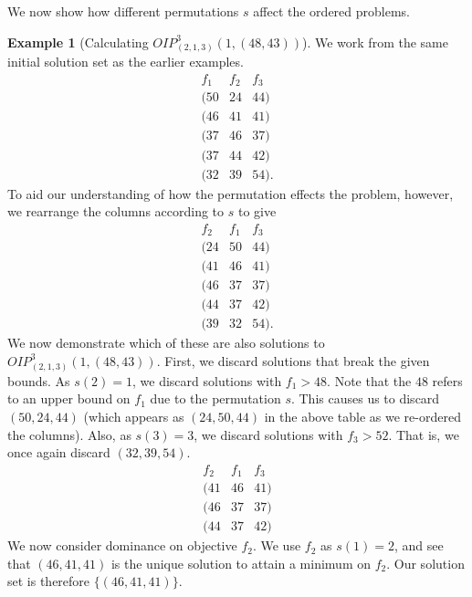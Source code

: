 \documentclass{amsart}
\theoremstyle{definition}
\newtheorem{example}{Example}
\begin{document}
We now show how different permutations $s$ affect the ordered problems.
\begin{example}[Calculating ${O\!I\!P}^3_{(2,1,3)}(1, (48,43))$]\label{ex:lips}
  We work from the same initial solution set as the earlier examples.
\[
\begin{array}{ccc}
  f_1 & f_2 & f_3 \\ \hline
  (50 & 24 & 44) \\
  (46 & 41 & 41) \\
  (37 & 46 & 37) \\
  (37 & 44 & 42) \\
  (32 & 39 & 54).
\end{array}
\]
To aid our understanding of how the permutation effects the problem, however, we rearrange the columns according to $s$ to give
\[
\begin{array}{ccc}
  f_2 & f_1 & f_3 \\ \hline
  (24 & 50 & 44) \\
  (41 & 46 & 41) \\
  (46 & 37 & 37) \\
  (44 & 37 & 42) \\
  (39 & 32 & 54).
\end{array}
\]
  We now demonstrate which of these are also solutions to ${O\!I\!P}^3_{(2,1,3)}(1, (48, 43))$.
  First, we discard solutions that break the given bounds.
  As $s(2) = 1$, we discard solutions with $f_1 > 48$.
  Note that the $48$ refers to an upper bound on $f_1$ due to the permutation $s$.
  This causes us to discard $(50, 24, 44)$ (which appears as $(24, 50, 44)$ in the above table as we re-ordered the columns).
  Also, as $s(3) = 3$, we discard solutions with $f_3 > 52$.
  That is, we once again discard $(32,39,54)$.
\[
\begin{array}{c|cc}
  f_2 & f_1 & f_3 \\ \hline
  (41 & 46 & 41) \\
  (46 & 37 & 37) \\
  (44 & 37 & 42) 
\end{array}
\]
  We now consider dominance on objective $f_2$.
  We use $f_2$ as $s(1) = 2$, and see that $(46, 41,41 )$ is the unique solution to attain a minimum on $f_2$.
  Our solution set is therefore $\{ (46, 41, 41)\}$.
\end{example}
\end{document}
